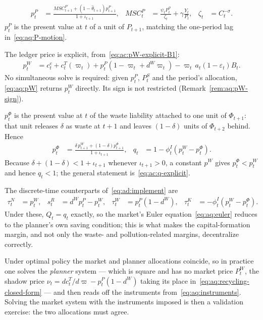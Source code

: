 \begin{align}
p^P_t &= \frac{MSC^P_{t+1}+\left(1-\widehat\theta_{t+1}\right)p^P_{t+1}}{1+\iota_{t+1}},
&
MSC^P_t &= \frac{\psi_tP_t^{\phi}}{\zeta_t}+\gamma\frac{Y_t}{P_t},
&
\zeta_t &= C_t^{-\sigma}.
\label{eq:aq:pP}
\end{align}
$p^P_t$ is the present value at $t$ of a unit of $P_{t+1}$, matching the one-period lag in~\eqref{eq:aq:P-motion}.

 The ledger price is explicit, from~\eqref{eq:ac:pW-explicit-B1}:
\begin{align}
p^W_t &= c^c_t+c^T_t(\varpi_t)+p^P_t\left(1-\varpi_t+d^W\varpi_t\right)-\varpi_t\,a_t\left(1-\varepsilon_t\right)B_t.
\label{eq:aq:pW}
\end{align}
No simultaneous solve is required: given $p^P_t$, $P^S_t$ and the period's allocation, \eqref{eq:aq:pW} returns $p^W_t$ directly. Its sign is not restricted (Remark~\ref{rem:aq:pW-sign}).

 $p^\Phi_t$ is the present value at $t$ of the waste liability attached to one unit of $\Phi_{t+1}$: that unit releases $\delta$ as waste at $t+1$ and leaves $\left(1-\delta\right)$ units of $\Phi_{t+2}$ behind. Hence
\begin{align}
p^\Phi_t &= \frac{\delta\,p^W_{t+1}+\left(1-\delta\right)p^\Phi_{t+1}}{1+\iota_{t+1}},
&
q_t &= 1-\phi^I_t\left(p^W_t-p^\Phi_t\right).
\label{eq:aq:pPhi-discrete}
\end{align}
Because $\delta+\left(1-\delta\right)<1+\iota_{t+1}$ whenever $\iota_{t+1}>0$, a constant $p^W$ gives $p^\Phi_t<p^W_t$ and hence $q_t<1$; the general statement is~\eqref{eq:ac:q-explicit}.

 The discrete-time counterparts of~\eqref{eq:ad:implement} are
\begin{align}
\tau^N_t &= p^W_t,
&
s^R_t &= d^Wp^P_t-p^W_t,
&
\tau^W_t &= p^P_t\left(1-d^W\right),
&
\tau^K_t &= -\phi^I_t\left(p^W_t-p^\Phi_t\right).
\label{eq:aq:instruments}
\end{align}
Under these, $Q_t=q_t$ exactly, so the market's Euler equation~\eqref{eq:aq:euler} reduces to the planner's own saving condition; this is what makes the capital-formation margin, and not only the waste- and pollution-related margins, decentralize correctly.

 Under optimal policy the market and planner allocations coincide, so in practice one solves the \emph{planner} system --- which is square and has no market price $P^W_t$, the shadow price $\nu_t=dc^T_t/d\varpi-p^P_t\left(1-d^W\right)$ taking its place in~\eqref{eq:aq:recycling-closed-form} --- and then reads off the instruments from~\eqref{eq:aq:instruments}. Solving the market system with the instruments imposed is then a validation exercise: the two allocations must agree.

